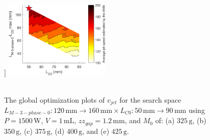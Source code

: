 \begin{figure}[!ht]
                ]{
                    \includegraphics[width=0.45\textwidth]{chap4/images3/400g.png}
                    \label{fig:chapter/rsm/LTFM/optimization/400}
                }
                \\
                \\
                \caption{
                    The global optimization plots of $v_{jet}$ for the search space $L_{M-3-phase-0}:120\,\mathrm{mm}\rightarrow 160\,\mathrm{mm} \times L_{C0}:50\,\mathrm{mm}\rightarrow 90\,\mathrm{mm}$ using $P=1500\,\mathrm{W}$, $V=1\,\mathrm{mL}$, $zz_{gap}=1.2\,\mathrm{mm}$,  and $M_0$ of: (a) $325\,\mathrm{g}$, (b) $350\,\mathrm{g}$, (c) $375\,\mathrm{g}$, (d) $400\,\mathrm{g}$, and (e) $425\,\mathrm{g}$.
                }   \label{fig:chapter/rsm/LTFM/optimization search space result for differnt mass}
            \end{figure}
            
            

            
    
